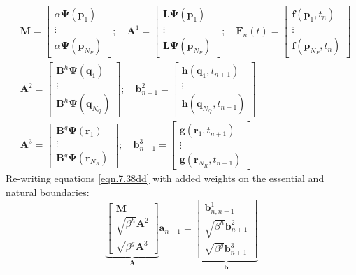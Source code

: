 \documentclass[10pt,letterpaper, onecolumn]{article}
\begin{document}
\begin{subequations}
\begin{align}
&\bm{M} = \begin{bmatrix} \alpha \bm{\Psi}(\bm{p}_1) \\ \vdots \\ \alpha \bm{\Psi}(\bm{p}_{N_P}) \end{bmatrix}; \quad
\bm{A}^1 =  \begin{bmatrix}  \bm{L}\bm{\Psi}(\bm{p}_1)  \\ \vdots \\ \bm{L}\bm{\Psi}(\bm{p}_{N_P})
\end{bmatrix}; \quad
\bm{F}_n(t) = \begin{bmatrix} \bm{f}(\bm{p}_1,t_n)  \\ \vdots \\  \bm{f}(\bm{p}_{N_P},t_n) \end{bmatrix} \\
&\bm{A}^2 = \begin{bmatrix}   \bm{B}^h  \bm{\Psi}(\bm{q}_1) \\ \vdots \\ 
 \bm{B}^h  \bm{\Psi}(\bm{q}_{N_Q}) \end{bmatrix}; \quad
\bm{b}^2_{n+1} = \begin{bmatrix}   \bm{h}(\bm{q}_1,t_{n+1})  \\ \vdots \\ 
 \bm{h}(\bm{q}_{N_Q},t_{n+1}) \end{bmatrix} \\
& \bm{A}^3 = \begin{bmatrix}   \bm{B}^g  \bm{\Psi}(\bm{r}_1) \\ \vdots \\  
 \bm{B}^g  \bm{\Psi}(\bm{r}_{N_R}) \end{bmatrix}; \quad
\bm{b}^3_{n+1} = \begin{bmatrix}   \bm{g}(\bm{r}_1,t_{n+1})  \\ \vdots \\ 
 \bm{g}(\bm{r}_{N_R},t_{n+1}) \end{bmatrix}
\end{align}
\end{subequations}
%
Re-writing equations \eqref{eqn.7.38dd} with added weights on the essential and natural boundaries:
%
\begin{equation}
\underbrace{\begin{bmatrix} \bm{M} \\ \sqrt{\beta^h} \bm{A}^2 \\ \sqrt{\beta^g}\bm{A}^3 \end{bmatrix} }_{\bm{A}}
\bm{a}_{n+1}
= \underbrace{ \begin{bmatrix}  \bm{b}^1_{n,n-1} \\ \sqrt{\beta^h} \bm{b}^2_{n+1} \\ \sqrt{\beta^g} \bm{b}^3_{n+1} \end{bmatrix}}_{\bm{b}}
\label{eqn7.40}
\end{equation}
\end{document}

